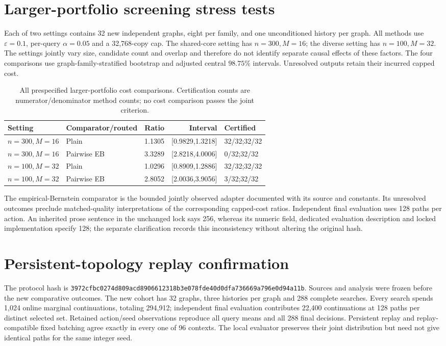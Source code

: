 \documentclass[preprint,11pt,sort&compress]{elsarticle}
\begin{document}
\FloatBarrier\section{Larger-portfolio screening stress tests}
Each of two settings contains 32 new independent graphs, eight per family, and one unconditioned history per graph. All methods use $\varepsilon=0.1$, per-query $\alpha=0.05$ and a 32,768-copy cap. The shared-core setting has $n=300,M=16$; the diverse setting has $n=100,M=32$. The settings jointly vary size, candidate count and overlap and therefore do not identify separate causal effects of these factors. The four comparisons use graph-family-stratified bootstrap and adjusted central $98.75\%$ intervals. Unresolved outputs retain their incurred capped cost.
\begin{table}[ht]
\centering\small
\caption{All prespecified larger-portfolio cost comparisons. Certification counts are numerator/denominator method counts; no cost comparison passes the joint criterion.}
\begin{tabular}{llrrl}
\toprule Setting & Comparator/routed & Ratio & Interval & Certified\\\midrule
$n=300,M=16$ & Plain & 1.1305 & [0.9829,1.3218] & 32/32;32/32\\
$n=300,M=16$ & Pairwise EB & 3.3289 & [2.8218,4.0006] & 0/32;32/32\\
$n=100,M=32$ & Plain & 1.0296 & [0.8909,1.2886] & 32/32;32/32\\
$n=100,M=32$ & Pairwise EB & 2.8052 & [2.0036,3.9056] & 3/32;32/32\\
\bottomrule\end{tabular}
\end{table}
The empirical-Bernstein comparator is the bounded jointly observed adapter documented with its source and constants. Its unresolved outcomes preclude matched-quality interpretations of the corresponding capped-cost ratios. Independent final evaluation uses 128 paths per action. An inherited prose sentence in the unchanged lock says 256, whereas its numeric field, dedicated evaluation description and locked implementation specify 128; the separate clarification records this inconsistency without altering the original hash.

\FloatBarrier\section{Persistent-topology replay confirmation}
The protocol hash is \nolinkurl{3972cfbc0274d809acd8906612318b3e078fde40d0dfa736669a796e0d94a11b}. Sources and analysis were frozen before the new comparative outcomes. The new cohort has 32 graphs, three histories per graph and 288 complete searches. Every search spends 1,024 online marginal continuations, totaling 294,912; independent final evaluation contributes 22,400 continuations at 128 paths per distinct selected set. Retained action/seed observations reproduce all query means and all 288 final decisions. Persistent replay and replay-compatible fixed batching agree exactly in every one of 96 contexts. The local evaluator preserves their joint distribution but need not give identical paths for the same integer seed.
\end{document}
